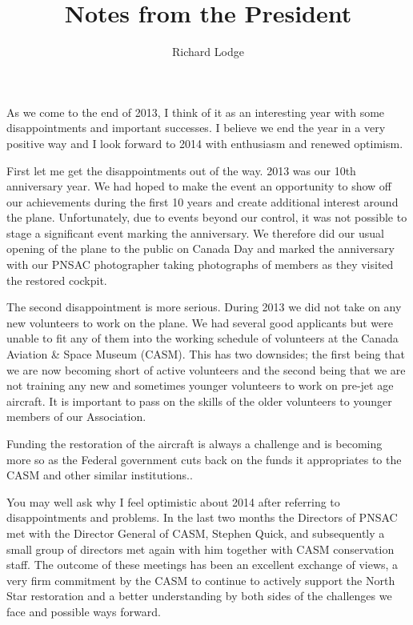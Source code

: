 
%


\title{Notes from the President}
\author{Richard Lodge}

\maketitle

As we come to the end of 2013, I think of it as an interesting year
with some disappointments and important successes. I believe we end
the year in a very positive way and I look forward to 2014 with
enthusiasm and renewed optimism.

First let me get the disappointments out of the way. 2013 was our 10th
anniversary year. We had hoped to make the event an opportunity to
show off our achievements during the first 10 years and create
additional interest around the plane. Unfortunately, due to events
beyond our control, it was not possible to stage a significant event
marking the anniversary. We therefore did our usual opening of the
plane to the public on Canada Day and marked the anniversary with our
PNSAC photographer taking photographs of members as they visited the
restored cockpit.

The second disappointment is more serious. During 2013 we did not take
on any new volunteers to work on the plane. We had several good
applicants but were unable to fit any of them into the working
schedule of volunteers at the Canada Aviation \& Space Museum
(CASM). This has two downsides; the first being that we are now
becoming short of active volunteers and the second being that we are
not training any new and sometimes younger volunteers to work on
pre-jet age aircraft. It is important to pass on the skills of the
older volunteers to younger members of our Association.

Funding the restoration of the aircraft is always a challenge and is
becoming more so as the Federal government cuts back on the funds it
appropriates to the CASM and other similar institutions..

You may well ask why I feel optimistic about 2014 after referring to
disappointments and problems. In the last two months the Directors of
PNSAC met with the Director General of CASM, Stephen Quick, and
subsequently a small group of directors met again with him together
with CASM conservation staff. The outcome of these meetings has been
an excellent exchange of views, a very firm commitment by the CASM to
continue to actively support the North Star restoration and a better
understanding by both sides of the challenges we face and possible
ways forward.


